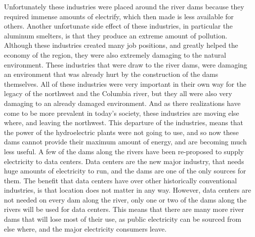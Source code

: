 \documentclass[12pt,twoside]{article}
\begin{document}
\par
Unfortunately these industries were placed around the river dams because they required immense amounts of electrify, which then made is less available for others. Another unfortunate side effect of these industries, in particular the aluminum smelters, is that they produce an extreme amount of pollution. Although these industries created many job positions, and greatly helped the economy of the region, they were also extremely damaging to the natural environment. These industries that were draw to the river dams, were damaging an environment that was already hurt by the construction of the dams themselves. All of these industries were very important in their own way for the legacy of the northwest and the Columbia river, but they all were also very damaging to an already damaged environment. And as there realizations have come to be more prevalent in today's society, these industries are moving else where, and leaving the northwest. This departure of the industries, means that the power of the hydroelectric plants were not going to use, and so now these dams cannot provide their maximum amount of energy, and are becoming much less useful. A few of the dams along the rivers have been re-proposed to supply electricity to data centers. Data centers are the new major industry, that needs huge amounts of electricity to run, and the dams are one of the only sources for them. The benefit that data centers have over other historically conventional industries, is that location does not matter in any way. However, data centers are not needed on every dam along the river, only one or two of the dams along the rivers will be used for data centers. This means that there are many more river dams that will lose most of their use, as public electricity can be sourced from else where, and the major electricity consumers leave.
\par
\end{document}
